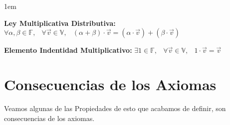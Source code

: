\documentclass[12pt, fleqn]{report}                             %
\newenvironment{Indentation}[1][0.75em]                         %
    {\begin{adjustwidth}{#1}{}}                                     %
    {\end{adjustwidth}}                                             %
\DeclareMathOperator \Space {\quad}                             %
\DeclareMathOperator \MiniSpace {\;}                            %
\begin{document}
\begin{Indentation}[1em]
\begin{itemize}
{                \item 
                    \textbf{Ley Multiplicativa Distributiva:}
                    $\forall \alpha, \beta \in \mathbb{F}, \MiniSpace
                        \forall \vec{v} \in \mathbb{V}, \MiniSpace
                            (\alpha + \beta) \cdot \vec{v} = 
                                    (\alpha \cdot \vec{v}) + (\beta \cdot \vec{v})$

                \item 
                    \textbf{Elemento Indentidad Multiplicativo:}
                    $\exists 1 \in \mathbb{F}, \MiniSpace
                        \forall \vec{v} \in \mathbb{V}, \MiniSpace 1 \cdot \vec{v} = \vec{v}$

            }
            \end{itemize}
            \end{Indentation}



        \clearpage
        \section{Consecuencias de los Axiomas}

            Veamos algunas de las Propiedades de esto que acabamos de definir, son consecuencias de los 
            axiomas.
\end{document}
